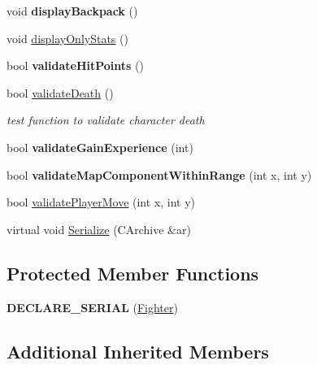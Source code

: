 \begin{DoxyCompactItemize}
\hypertarget{class_fighter_a1f026b1314d058a8033a19328a40e4cb}{}\label{class_fighter_a1f026b1314d058a8033a19328a40e4cb} 
void {\bfseries display\+Backpack} ()
\item 
void \hyperlink{class_fighter_a5dd8b95b965832bbae65d6285a9bac53}{display\+Only\+Stats} ()
\item 
\hypertarget{class_fighter_a235df759d42bb20bd6314abe806dd6ce}{}\label{class_fighter_a235df759d42bb20bd6314abe806dd6ce} 
bool {\bfseries validate\+Hit\+Points} ()
\item 
\hypertarget{class_fighter_a7372ff74df453241ee2d990a265fd71c}{}\label{class_fighter_a7372ff74df453241ee2d990a265fd71c} 
bool \hyperlink{class_fighter_a7372ff74df453241ee2d990a265fd71c}{validate\+Death} ()
\begin{DoxyCompactList}\small\item\em test function to validate character death \end{DoxyCompactList}\item 
\hypertarget{class_fighter_a05f927eea7af56811cce5a8ba2c8a349}{}\label{class_fighter_a05f927eea7af56811cce5a8ba2c8a349} 
bool {\bfseries validate\+Gain\+Experience} (int)
\item 
\hypertarget{class_fighter_a66d147cbc9c3690009cad90a6ee35f42}{}\label{class_fighter_a66d147cbc9c3690009cad90a6ee35f42} 
bool {\bfseries validate\+Map\+Component\+Within\+Range} (int x, int y)
\item 
bool \hyperlink{class_fighter_ab2a750803d7df7f1d66e9b40074f7a41}{validate\+Player\+Move} (int x, int y)
\item 
virtual void \hyperlink{class_fighter_a44b8e8e71e55b645c4fe7f67ef844e87}{Serialize} (C\+Archive \&ar)
\end{DoxyCompactItemize}
\subsection*{Protected Member Functions}
\begin{DoxyCompactItemize}
\item 
\hypertarget{class_fighter_a349455a2930ba35778477b876c5ea0eb}{}\label{class_fighter_a349455a2930ba35778477b876c5ea0eb} 
{\bfseries D\+E\+C\+L\+A\+R\+E\+\_\+\+S\+E\+R\+I\+AL} (\hyperlink{class_fighter}{Fighter})
\end{DoxyCompactItemize}
\subsection*{Additional Inherited Members}


